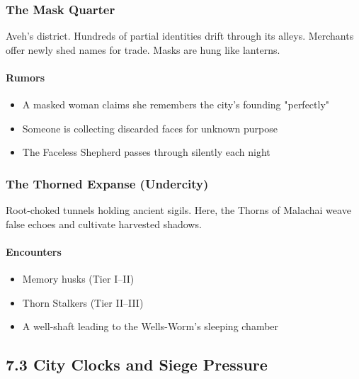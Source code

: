 \documentclass[11pt]{book}
\begin{document}
\subsubsection*{The Mask Quarter}

Aveh's district. Hundreds of partial identities drift through its alleys.
Merchants offer newly shed names for trade. Masks are hung like lanterns.

\paragraph{Rumors}
\begin{itemize}[leftmargin=*]
    \item A masked woman claims she remembers the city's founding "perfectly"  
    \item Someone is collecting discarded faces for unknown purpose  
    \item The Faceless Shepherd passes through silently each night
\end{itemize}


\subsubsection*{The Thorned Expanse (Undercity)}

Root-choked tunnels holding ancient sigils.  
Here, the Thorns of Malachai weave false echoes and cultivate harvested shadows.

\paragraph{Encounters}
\begin{itemize}[leftmargin=*]
    \item Memory husks (Tier I--II)  
    \item Thorn Stalkers (Tier II--III)  
    \item A well-shaft leading to the Wells-Worm's sleeping chamber
\end{itemize}

\subsection{7.3 City Clocks and Siege Pressure}
\end{document}
